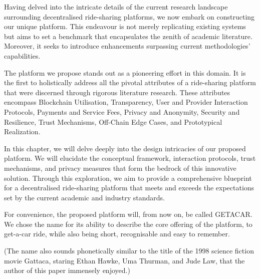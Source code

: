Having delved into the intricate details of the current research landscape surrounding decentralised ride-sharing platforms, we now embark on constructing our unique platform. This endeavour is not merely replicating existing systems but aims to set a benchmark that encapsulates the zenith of academic literature. Moreover, it seeks to introduce enhancements surpassing current methodologies' capabilities.


The platform we propose stands out as a pioneering effort in this domain. It is the first to holistically address all the pivotal attributes of a ride-sharing platform that were discerned through rigorous literature research. These attributes encompass Blockchain Utilisation, Transparency, User and Provider Interaction Protocols, Payments and Service Fees, Privacy and Anonymity, Security and Resilience, Trust Mechanisms, Off-Chain Edge Cases, and Prototypical Realization.

In this chapter, we will delve deeply into the design intricacies of our proposed platform. We will elucidate the conceptual framework, interaction protocols, trust mechanisms, and privacy measures that form the bedrock of this innovative solution. Through this exploration, we aim to provide a comprehensive blueprint for a decentralised ride-sharing platform that meets and exceeds the expectations set by the current academic and industry standards.

For convenience, the proposed platform will, from now on, be called GETACAR. We chose the name for its ability to describe the core offering of the platform, to get-a-car ride, while also being short, recognisable and easy to remember.

(The name also sounds phonetically similar to the title of the 1998 science fiction movie Gattaca, staring Ethan Hawke, Uma Thurman, and Jude Law, that the author of this paper immensely enjoyed.)